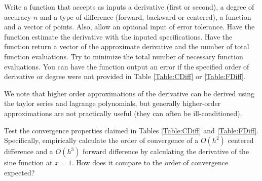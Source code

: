 \begin{problem}
Write a function that accepts as inputs a derivative (first or second), a degree of accuracy $n$ and a type of difference (forward, backward or centered), a function and a vector of points. Also, allow an optional input of error tolerance. Have the function estimate the derivative with the inputed specifications. Have the function return a vector of the approximate derivative and the number of total function evaluations. Try to minimize the total number of necessary function evaluations. You can have the function output an error if the specified order of derivative or degree were not provided in Table \ref{Table:CDiff} or \ref{Table:FDiff}.
\end{problem}

We note that higher order approximations of the derivative can be derived using the taylor series and lagrange polynomials, but generally higher-order approximations are not practically useful (they can often be ill-conditioned).

\begin{problem}
Test the convergence properties claimed in Tables \ref{Table:CDiff} and \ref{Table:FDiff}. Specifically, empirically calculate the order of convergence of a $O(h^2)$ centered difference and a $O(h^3)$ forward difference by calculating the derivative of the sine function at $x=1$. How does it compare to the order of convergence expected?
\end{problem}
